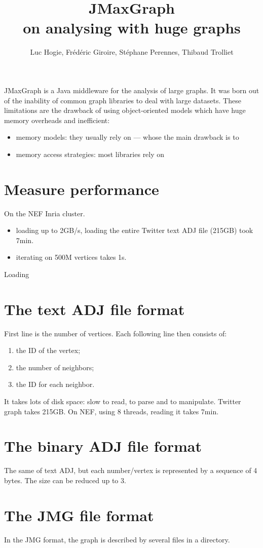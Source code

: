 \documentclass[11pt,a4paper]{article}
\title{JMaxGraph\\ on analysing with huge graphs}
\author{Luc Hogie, Frédéric Giroire, Stéphane Perennes, Thibaud Trolliet}
\begin{document}
\maketitle

JMaxGraph is a Java middleware for the analysis of large graphs. It was born out of the inability of common graph libraries
to deal with large datasets. These limitations are the drawback of using object-oriented models which  have huge memory
overheads and inefficient:
\begin{itemize}
\item  memory models: they usually rely on  --- whose the main drawback is to
\item memory access strategies: most libraries rely on 
\end{itemize}

\section{Measure performance}
On the NEF Inria cluster.
\begin{itemize}
\item loading up to 2GB/s, loading the entire Twitter text ADJ file (215GB) took 7min.
\item iterating on 500M vertices takes 1s.
\end{itemize}
Loading
\section{The text ADJ file format}
First line is the number of vertices. Each following line then consists of:
\begin{enumerate}
\item the ID of the vertex;
\item the number of neighbors;
\item the ID for each neighbor.
\end{enumerate}
It takes lots of disk space: slow to read, to parse and to manipulate.
Twitter graph takes 215GB. 
On NEF, using 8 threads, reading it takes 7min.

\section{The binary ADJ file format}
The same of text ADJ, but each number/vertex is represented by a sequence of 4 bytes.
The size can be reduced up to 3.

\section{The JMG file format}
In the JMG format, the graph is described by several files in a directory.
\end{document}
